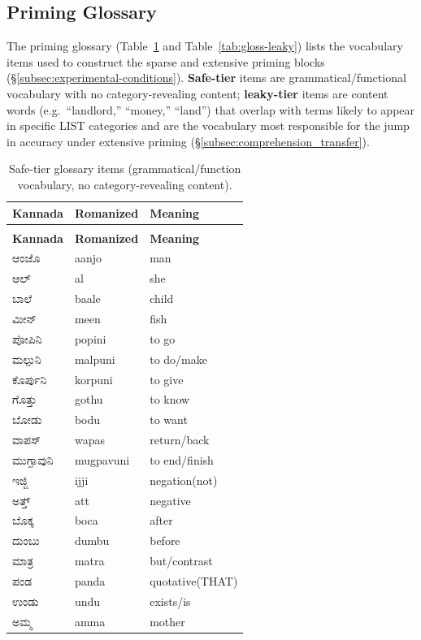 \documentclass[11pt]{article}
\begin{document}
\renewcommand{\arraystretch}{1}

\subsection{Priming Glossary}
\label{app:glossary}

The priming glossary (Table~\ref{tab:gloss-safe} and Table~\ref{tab:gloss-leaky})
lists the vocabulary items used to construct the sparse and extensive
priming blocks (\S\ref{subsec:experimental-conditions}). \textbf{Safe-tier} items are grammatical/functional
vocabulary with no category-revealing content; \textbf{leaky-tier} items
are content words (e.g.\ ``landlord,'' ``money,'' ``land'') that overlap
with terms likely to appear in specific LIST categories and are the
vocabulary most responsible for the jump in accuracy under extensive
priming (\S\ref{subsec:comprehension_transfer}). 

\begin{longtable}{>{\kannadafont}p{} p{} p{}}
\caption{Safe-tier glossary items (grammatical/function vocabulary, no category-revealing content).}
\label{tab:gloss-safe} \\
\toprule
\normalfont\textbf{Kannada} & \textbf{Romanized} & \textbf{Meaning} \\
\midrule
\endfirsthead
\multicolumn{3}{c}{\tablename\ \thetable{} -- continued} \\
\toprule
\normalfont\textbf{Kannada} & \textbf{Romanized} & \textbf{Meaning} \\
\midrule
\endhead
\bottomrule
\endlastfoot
ಆಂಜೊ & aanjo & man \\
ಆಲ್ & al & she \\
ಬಾಲೆ & baale & child \\
ಮೀನ್ & meen & fish \\
ಪೋಪಿನಿ & popini & to go \\
ಮಲ್ಪುನಿ & malpuni & to do/make \\
ಕೊರ್ಪುನಿ & korpuni & to give \\
ಗೊತ್ತು & gothu & to know \\
ಬೋಡು & bodu & to want \\
ವಾಪಸ್ & wapas & return/back \\
ಮುಗ್ಪಾವುನಿ & mugpavuni & to end/finish \\
ಇಜ್ಜಿ & ijji & negation(not) \\
ಅತ್ತ್ & att & negative \\
ಬೊಕ್ಕ & boca & after \\
ದುಂಬು & dumbu & before \\
ಮಾತ್ರ & matra & but/contrast \\
ಪಂಡ & panda & quotative(THAT) \\
ಉಂಡು & undu & exists/is \\
ಅಮ್ಮ & amma & mother \\
\end{longtable}
\end{document}

